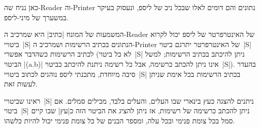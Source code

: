 כאן נניח שה-Reader וה-Printer נתונים והם דומים לאלו שבכל ניב של ליספ, ונעסוק
בעיקר במשערך של מיני-ליספ.

המשמעות של המונח \ע|כתיב| היא שמרכיב ה-Reader של האינטרפרטר של ליספ יכול לקרוא
ביטויי~\E|S| הנתונים בכתיב הרשימות ושמרכיב ה-Printer של האינטרפרטר יתרגם
ביטוי~\E|S| לכתיב הרשימות כשהדבר אפשרי (לא כל ביטוי~\E|S| ניתן להיכתב בכתיב
הרשימות; למשל הביטוי \E|(a.b)| אינו ניתן להכתב כרשימה, אבל כל רשימה ניתנת
להיכתב כביטוי~\E|S|). בהעדר סיבה מיוחדת, מתכנתי ליספ נוהגים לכתוב ביטויי~\E|S|
בכתיב הרשימות בכל אימת שניתן לעשות זאת.

ראינו שביטויי~\E|S| ניתנים להצגה כעץ בינארי שבו העלים, והעלים בלבד, מכילים
סמלים. אם ביטוי~\E|S| ניתן להכתב כרשימה של רשימות, אז ניתן להציג את הביטוי
הזה כ\ע|עץ| שבו קיים סמל בכל צומת פנימי ובכל עלה, ומספר הבנים של כל צומת פנימי
יכול להיות כלשהו.
